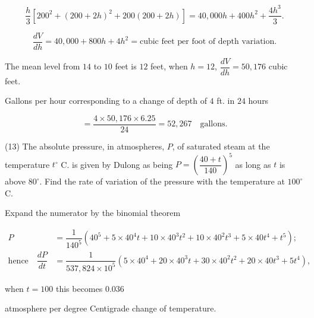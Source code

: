 \documentclass{ximera}
\begin{document}
$$
\dfrac{h}{3}[200^2+(200+2h)^2+200(200+2h)]=40,000h+400h^2+\dfrac{4h^3}{3}.
$$

$$
\dfrac{dV}{dh}=40,000+800h+4h^2=\text{cubic feet per foot of depth variation.} 
$$

The mean level from $14$ to $10$ feet is $12$ feet, when $h=12$, $\dfrac{dV}{dh}=50,176$ cubic feet.

Gallons per hour corresponding to a change of depth of $4$ ft. in $24$ hours 

$$
=\dfrac{4\times 50,176\times 6.25}{24}=52,267\quad\text{gallons}.
$$

\par\noindent
(13) The absolute pressure, in atmospheres, $P$, of saturated steam at the temperature $t^{\circ}$ C. is given 
by Dulong as being $P=\left(\dfrac{40+t}{140}\right)^5$ as long as $t$ is above $80^{\circ}$. Find the 
rate of variation of the pressure with the temperature at $100^{\circ}$ C.

Expand the numerator by the binomial theorem %

\begin{align*}
P &=\dfrac{1}{140^5}(40^5+5\times40^4t+10\times 40^3t^2+10\times 40^2t^3+5\times 40t^4+t^5);\\
\text{hence}\quad \dfrac{dP}{dt} &=\dfrac{1}{537,824\times10^5}(5\times40^4+20\times40^3t+30\times40^2t^2
+20\times40t^3+5t^4),
\end{align*}

when $t=100$ this becomes $0.036$

atmosphere per degree Centigrade change of temperature.
\end{document}
